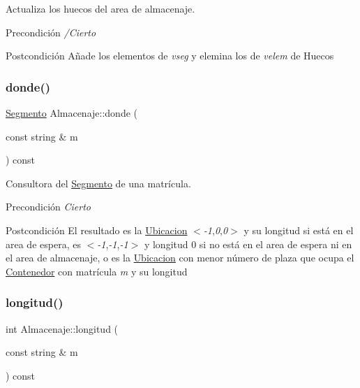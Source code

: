 Actualiza los huecos del area de almacenaje. 

\begin{DoxyPrecond}{Precondición}
{\itshape /\+Cierto} 
\end{DoxyPrecond}
\begin{DoxyPostcond}{Postcondición}
Añade los elementos de {\itshape vseg} y elemina los de {\itshape velem} de Huecos 
\end{DoxyPostcond}
\mbox{\label{class_almacenaje_afe08e4bca255d4baf3750019622e6cb2}} 
\subsubsection{\texorpdfstring{donde()}{donde()}}
{\footnotesize\ttfamily \hyperlink{class_segmento}{Segmento} Almacenaje\+::donde (\begin{DoxyParamCaption}\item[{const string \&}]{m }\end{DoxyParamCaption}) const}



Consultora del \hyperlink{class_segmento}{Segmento} de una matrícula. 

\begin{DoxyPrecond}{Precondición}
{\itshape Cierto} 
\end{DoxyPrecond}
\begin{DoxyPostcond}{Postcondición}
El resultado es la \hyperlink{class_ubicacion}{Ubicacion} $<${\itshape -\/1},{\itshape 0},{\itshape 0}$>$ y su longitud si está en el area de espera, es $<${\itshape -\/1},{\itshape -\/1},{\itshape -\/1}$>$ y longitud 0 si no está en el area de espera ni en el area de almacenaje, o es la \hyperlink{class_ubicacion}{Ubicacion} con menor número de plaza que ocupa el \hyperlink{class_contenedor}{Contenedor} con matrícula {\itshape m} y su longitud 
\end{DoxyPostcond}
\mbox{\label{class_almacenaje_a745cf4e181058d391aed220843d6cede}} 
\subsubsection{\texorpdfstring{longitud()}{longitud()}}
{\footnotesize\ttfamily int Almacenaje\+::longitud (\begin{DoxyParamCaption}\item[{const string \&}]{m }\end{DoxyParamCaption}) const}



